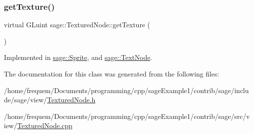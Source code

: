 \subsubsection{\texorpdfstring{getTexture()}{getTexture()}}
{\footnotesize\ttfamily virtual G\+Luint sage\+::\+Textured\+Node\+::get\+Texture (\begin{DoxyParamCaption}{ }\end{DoxyParamCaption})\hspace{0.3cm}{\ttfamily [pure virtual]}}



Implemented in \mbox{\hyperlink{classsage_1_1Sprite_aa75f3595b809f99847a9642ce2bf319a}{sage\+::\+Sprite}}, and \mbox{\hyperlink{classsage_1_1TextNode_ae21f17c6cb993692d8da89424b2581d7}{sage\+::\+Text\+Node}}.



The documentation for this class was generated from the following files\+:\begin{DoxyCompactItemize}
\item 
/home/frequem/\+Documents/programming/cpp/sage\+Example1/contrib/sage/include/sage/view/\mbox{\hyperlink{TexturedNode_8h}{Textured\+Node.\+h}}\item 
/home/frequem/\+Documents/programming/cpp/sage\+Example1/contrib/sage/src/view/\mbox{\hyperlink{TexturedNode_8cpp}{Textured\+Node.\+cpp}}\end{DoxyCompactItemize}
